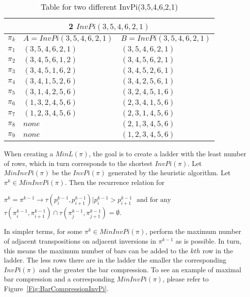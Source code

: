 \begin{table}[!htp]
    \begin{tabular}{|p{3cm}|p{5cm}|p{5cm}|}
        \hline 
    \multicolumn{3}{|c|}{2 $InvPi(3,5,4,6,2,1)$}\\
    \hline 
    \hline 
    $\pi_{k}$ & $A=InvPi(3,5,4,6,2,1)$ & $B=InvPi(3,5,4,6,2,1)$\\ 
    \hline 
    $\pi_{1}$ & $(3,5,4,6,2,1)$ & $(3,5,4,6,2,1)$\\ 
    \hline
    $\pi_{2}$ & $(3,4,5,6,1,2)$ & $(3,4,5,6,2,1)$\\ 
    \hline 
    $\pi_{3}$ & $(3,4,5,1,6,2)$ & $(3,4,5,2,6,1)$ \\ 
    \hline 
    $\pi_{4}$ & $(3,4,1,5,2,6)$ & $(3,4,2,5,6,1)$ \\ 
    \hline 
    $\pi_{5}$ & $(3,1,4,2,5,6)$ & $(3,2,4,5,1,6)$\\ 
    \hline 
    $\pi_{6}$ & $(1,3,2,4,5,6)$ & $(2,3,4,1,5,6)$\\ 
    \hline 
    $\pi_{7}$ & $(1,2,3,4,5,6)$ & $(2,3,1,4,5,6)$\\ 
    \hline 
    $\pi_{8}$ & $none$  & $(2,1,3,4,5,6)$ \\ 
    \hline 
     $\pi_{9}$ & $none$  & $(1,2,3,4,5,6)$ \\ 
    \hline 

        
    \end{tabular}
    \caption{Table for two different InvPi(3,5,4,6,2,1)}
    \label{Tab:InvPi}
\end{table}



When creating a $MinL(\pi)$, the goal is to create a ladder with the least number of rows, which in turn corresponds 
to the shortest $InvPi(\pi)$.
Let $MinInvPi(\pi)$ be the $InvPi(\pi)$ generated by the heuristic algorithm.
Let $\pi^{k} \in MinInvPi(\pi)$. Then the recurrence relation for \begin{small}$\pi^{k}=\pi^{k-1} \rightarrow \tau(p^{k-1}_{i},p^{k-1}_{i+1}) | p^{k-1}_{i}>p^{k-1}_{i+1}$ $\mbox{ and for any }$$\tau(\pi^{k-1}_{i},\pi^{k-1}_{i+1}) \cap \tau(\pi^{k-1}_{j},\pi^{k-1}_{j+1}) = \emptyset$.\end{small}
In simpler terms, for some $\pi^{k} \in MinInvPi(\pi)$, perform the maximum number 
of adjacent transpositions on adjacent inversions in $\pi^{k-1}$ as is possible.
In turn, this means the maximum number of bars can be added to the $kth$ row in the ladder.
The less rows there are in the ladder the smaller the corresponding 
 $InvPi(\pi)$ and the greater the bar compression.
 To see an example of maximal bar compression and a corresponding $MinInvPi(\pi)$, please refer to Figure~\ref{Fig:BarCompressionInvPi}.

